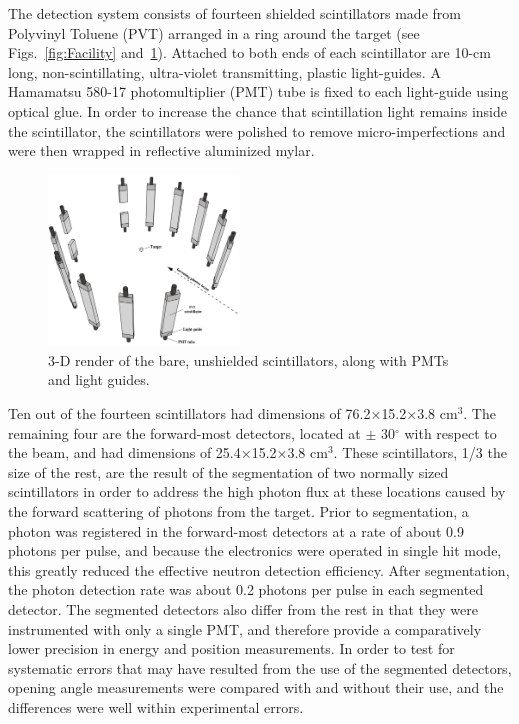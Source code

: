\documentclass[%
 reprint,
 amsmath,amssymb,
 aps,
 nofootinbib
]{revtex4-1}
\begin{document}
The detection system consists of fourteen shielded scintillators made from Polyvinyl Toluene (PVT) arranged in a ring around the target (see Figs.~\ref{fig:Facility} and~\ref{fig:DetGeom}).
Attached to both ends of each scintillator are 10-cm long, non-scintillating, ultra-violet transmitting, plastic light-guides.
A Hamamatsu 580-17 photomultiplier (PMT) tube is fixed to each light-guide using optical glue.
In order to increase the chance that scintillation light remains inside the scintillator, the scintillators were polished to remove micro-imperfections and were then wrapped in reflective aluminized mylar.
\begin{figure}[]
    \centering
    \includegraphics[width = 0.45\textwidth]{Detectors.png}
    \caption{3-D render of the bare, unshielded scintillators, along with PMTs and light guides.}
    \label{fig:DetGeom}
\end{figure}

Ten out of the fourteen scintillators had dimensions of 76.2$\times$15.2$\times$3.8 cm$^3$.
The remaining four are the forward-most detectors, located at $\pm$ 30$^{\circ}$ with respect to the beam, and had dimensions of 25.4$\times$15.2$\times$3.8 cm$^3$.
These scintillators, 1/3 the size of the rest, are the result of the segmentation of two normally sized scintillators in order to address the high photon flux at these locations caused by the forward scattering of photons from the target.
Prior to segmentation, a photon was registered in the forward-most detectors at a rate of about 0.9 photons per pulse, and because the electronics were operated in single hit mode, this greatly reduced the effective neutron detection efficiency.
After segmentation, the photon detection rate was about 0.2 photons per pulse in each segmented detector.
The segmented detectors also differ from the rest in that they were instrumented with only a single PMT, and therefore provide a comparatively lower precision in energy and position measurements.
In order to test for systematic errors that may have resulted from the use of the segmented detectors, opening angle measurements were compared with and without their use, and the differences were well within experimental errors.
\end{document}
